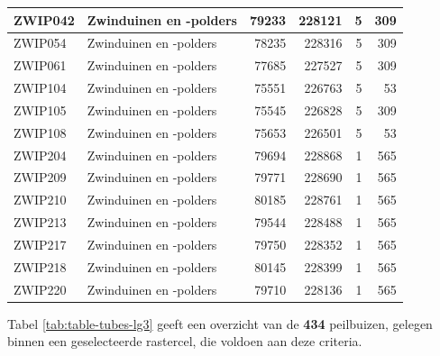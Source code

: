 \documentclass[11pt,]{book}
\begin{document}
\begin{table}
\begin{tabular}[t]{l|l|r|r|r|r}
\hline
ZWIP042 & Zwinduinen en -polders & 79233 & 228121 & 5 & 309\\
\hline
ZWIP054 & Zwinduinen en -polders & 78235 & 228316 & 5 & 309\\
\hline
ZWIP061 & Zwinduinen en -polders & 77685 & 227527 & 5 & 309\\
\hline
ZWIP104 & Zwinduinen en -polders & 75551 & 226763 & 5 & 53\\
\hline
ZWIP105 & Zwinduinen en -polders & 75545 & 226828 & 5 & 309\\
\hline
ZWIP108 & Zwinduinen en -polders & 75653 & 226501 & 5 & 53\\
\hline
ZWIP204 & Zwinduinen en -polders & 79694 & 228868 & 1 & 565\\
\hline
ZWIP209 & Zwinduinen en -polders & 79771 & 228690 & 1 & 565\\
\hline
ZWIP210 & Zwinduinen en -polders & 80185 & 228761 & 1 & 565\\
\hline
ZWIP213 & Zwinduinen en -polders & 79544 & 228488 & 1 & 565\\
\hline
ZWIP217 & Zwinduinen en -polders & 79750 & 228352 & 1 & 565\\
\hline
ZWIP218 & Zwinduinen en -polders & 80145 & 228399 & 1 & 565\\
\hline
ZWIP220 & Zwinduinen en -polders & 79710 & 228136 & 1 & 565\\
\hline
\end{tabular}
\end{table}

Tabel \ref{tab:table-tubes-lg3} geeft een overzicht van de \textbf{434}
peilbuizen, gelegen binnen een geselecteerde rastercel, die voldoen aan
deze criteria.
\end{document}
